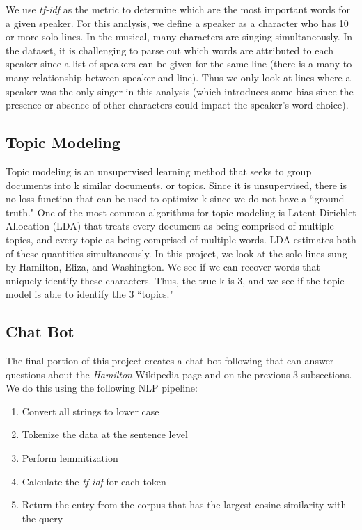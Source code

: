 \documentclass{article}
\begin{document}
We use \emph{tf-idf} as the metric to determine which are the most important words for a given speaker. For this analysis, we define a speaker as a character who has 10 or more solo lines. In the musical, many characters are singing simultaneously. In the dataset, it is challenging to parse out which words are attributed to each speaker since a list of speakers can be given for the same line (there is a many-to-many relationship between speaker and line). Thus we only look at lines where a speaker was the only singer in this analysis (which introduces some bias since the presence or absence of other characters could impact the speaker's word choice). 

\subsection{Topic Modeling}

Topic modeling is an unsupervised learning method that seeks to group documents into k similar documents, or topics. Since it is unsupervised, there is no loss function that can be used to optimize k since we do not have a ``ground truth." One of the most common algorithms for topic modeling is Latent Dirichlet Allocation (LDA) that treats every document as being comprised of multiple topics, and every topic as being comprised of multiple words. LDA estimates both of these quantities simultaneously. In this project, we look at the solo lines sung by Hamilton, Eliza, and Washington. We see if we can recover words that uniquely identify these characters. Thus, the true k is 3, and we see if the topic model is able to identify the 3 ``topics."

\subsection{Chat Bot}

The final portion of this project creates a chat bot following \cite{dass2018} that can answer questions about the \emph{Hamilton} Wikipedia page and on the previous 3 subsections. We do this using the following NLP pipeline:
\begin{singlespace}
\begin{enumerate}
 \item Convert all strings to lower case
 \item Tokenize the data at the sentence level
 \item Perform lemmitization
 \item Calculate the \emph{tf-idf} for each token
 \item Return the entry from the corpus that has the largest cosine similarity with the query
\end{enumerate}
\end{singlespace}
\end{document}
